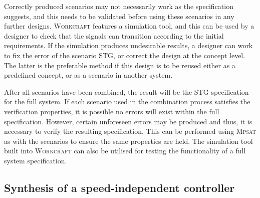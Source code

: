 \documentclass[british,compsoc]{IEEEtran}
\newcommand{\noun}[1]{\textsc{#1}}
\begin{document}
Correctly produced scenarios may not necessarily work as the specification
suggests, and this needs to be validated before using these scenarios
in any further designs. \noun{Workcraft} features a simulation tool,
and this can be used by a designer to check that the signals can transition
according to the initial requirements. If the simulation produces
undesirable results, a designer can work to fix the error of the scenario
STG, or correct the design at the concept level. The latter is the
preferable method if this design is to be reused either as a predefined
concept, or as a scenario in another system.

After all scenarios have been combined, the result will be the STG specification
for the full system. If each scenario used in the combination process satisfies
the verification properties, it is possible no errors will exist within the full
specification. However, certain unforeseen errors may be produced
and thus, it is necessary to verify the resulting specification. This can
be performed using \noun{Mpsat} as with the scenarios to ensure the same
properties are held. The simulation tool built into \noun{Workcraft} can also
be utilised for testing the functionality of a full system specification.

%
%


\subsection{Synthesis of a speed-independent controller}
\end{document}

